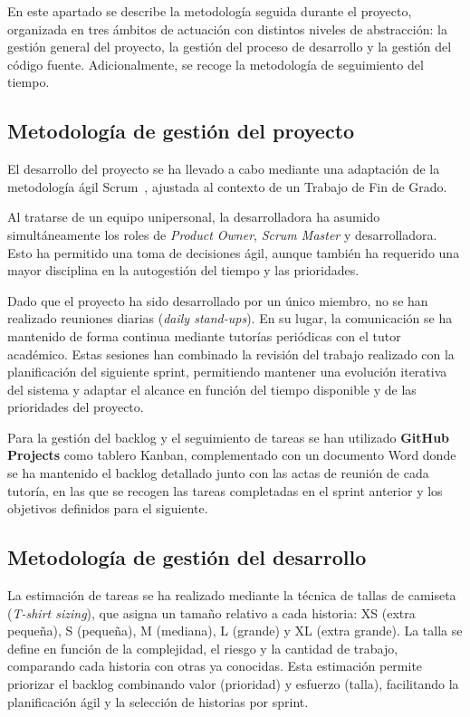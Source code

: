 En este apartado se describe la metodología seguida durante el proyecto, organizada en tres ámbitos de actuación con distintos niveles de abstracción: la gestión general del proyecto, la gestión del proceso de desarrollo y la gestión del código fuente. Adicionalmente, se recoge la metodología de seguimiento del tiempo.

\subsection{Metodología de gestión del proyecto}

El desarrollo del proyecto se ha llevado a cabo mediante una adaptación de la metodología ágil Scrum~\cite{scrumguide2020}, ajustada al contexto de un Trabajo de Fin de Grado.

Al tratarse de un equipo unipersonal, la desarrolladora ha asumido simultáneamente los roles de \textit{Product Owner}, \textit{Scrum Master} y desarrolladora. Esto ha permitido una toma de decisiones ágil, aunque también ha requerido una mayor disciplina en la autogestión del tiempo y las prioridades.

Dado que el proyecto ha sido desarrollado por un único miembro, no se han realizado reuniones diarias (\textit{daily stand-ups}). En su lugar, la comunicación se ha mantenido de forma continua mediante tutorías periódicas con el tutor académico. Estas sesiones han combinado la revisión del trabajo realizado con la planificación del siguiente sprint, permitiendo mantener una evolución iterativa del sistema y adaptar el alcance en función del tiempo disponible y de las prioridades del proyecto.

Para la gestión del backlog y el seguimiento de tareas se han utilizado \textbf{GitHub Projects} como tablero Kanban, complementado con un documento Word donde se ha mantenido el backlog detallado junto con las actas de reunión de cada tutoría, en las que se recogen las tareas completadas en el sprint anterior y los objetivos definidos para el siguiente.

\subsection{Metodología de gestión del desarrollo}

La estimación de tareas se ha realizado mediante la técnica de tallas de camiseta (\textit{T-shirt sizing}), que asigna un tamaño relativo a cada historia: XS (extra pequeña), S (pequeña), M (mediana), L (grande) y XL (extra grande). La talla se define en función de la complejidad, el riesgo y la cantidad de trabajo, comparando cada historia con otras ya conocidas. Esta estimación permite priorizar el backlog combinando valor (prioridad) y esfuerzo (talla), facilitando la planificación ágil y la selección de historias por sprint.

